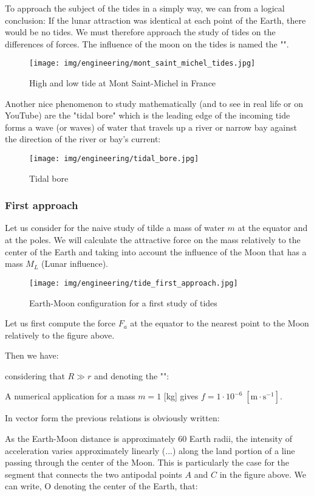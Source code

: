 	To approach the subject of the tides in a simply way, we can from a logical conclusion: If the lunar attraction was identical at each point of the Earth, there would be no tides. We must therefore approach the study of tides on the differences of forces. The influence of the moon on the tides is named the "".
	\begin{figure}[H]
		\centering
		\texttt{[image: img/engineering/mont\_saint\_michel\_tides.jpg]}
		\caption{High and low tide at Mont Saint-Michel in France}
	\end{figure}
	Another nice phenomenon to study mathematically (and to see in real life or on YouTube) are the "tidal bore" which is the leading edge of the incoming tide forms a wave (or waves) of water that travels up a river or narrow bay against the direction of the river or bay's current:
	\begin{figure}[H]
		\centering
		\texttt{[image: img/engineering/tidal\_bore.jpg]}
		\caption{Tidal bore}
	\end{figure}
	
	\subsubsection{First approach}
	Let us consider for the naive study of tilde a mass of water $m$ at the equator and at the poles. We will calculate the attractive force on the mass relatively to the center of the Earth and taking into account the influence of the Moon that has a mass $M_L$ (Lunar influence).
	\begin{figure}[H]
		\centering
		\texttt{[image: img/engineering/tide\_first\_approach.jpg]}
		\caption[]{Earth-Moon configuration for a first study of tides}
	\end{figure}
	Let us first compute the force $F_a$ at the equator to the nearest point to the Moon relatively to the figure above.

	Then we have:
	
	considering that $R \gg r$ and denoting the "":
	
	A numerical application for a mass $m= 1$ [kg] gives $f=1\cdot 10^{-6}\;[\text{m}\cdot \text{s}^{-1}]$.

	In vector form the previous relations is obviously written:
	
	As the Earth-Moon distance is approximately $60$ Earth radii, the intensity of acceleration varies approximately linearly (...) along the land portion of a line passing through the center of the Moon. This is particularly the case for the segment that connects the two antipodal points $A$ and $C$ in the figure above. We can write, O denoting the center of the Earth, that:
	
